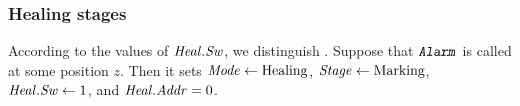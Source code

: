 \documentclass[12pt]{memoir}
\newcommand{\fld}[1]{\ensuremath{\textit{#1\/}}}
\newcommand{\rul}[1]{\ensuremath{\texttt{\slshape #1\/}}}
\newcommand{\z}{z}
\newcommand{\Addr}{\fld{Addr}}
\newcommand{\Mode}{\fld{Mode}}
\newcommand{\Heal}{\fld{Heal}}
\newcommand{\Stage}{\fld{Stage}}
\newcommand{\Sweep}{\fld{Sw}}
\newcommand{\Marking}{\mathrm{Marking}}
\newcommand{\Healing}{\mathrm{Healing}}
\newcommand{\Alarm}{\rul{Alarm}}
\begin{document}
\subsubsection{Healing stages}\label{sec:rec-stages}

According to the values of \( \Heal.\Sweep \), we distinguish .
%
%
Suppose that \( \Alarm \) is called at some position \( \z \).
Then it sets  \( \Mode\gets\Healing \),  \( \Stage\gets\Marking \),
\( \Heal.\Sweep \gets 1 \), and \( \Heal.\Addr = 0 \).
\end{document}
